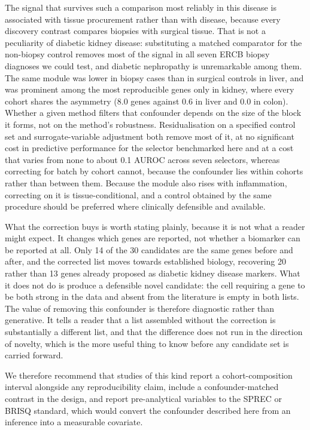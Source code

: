 \documentclass[pdflatex,sn-vancouver-num]{sn-jnl}
\theoremstyle{thmstyleone}
\theoremstyle{thmstyletwo}
\theoremstyle{thmstylethree}
\begin{document}
The signal that survives such a comparison most reliably in this disease is associated with
tissue procurement rather than with disease, because every discovery contrast compares biopsies with
surgical tissue. That is not a peculiarity of diabetic kidney disease: substituting a matched
comparator for the non-biopsy control removes most of the signal in all seven ERCB biopsy
diagnoses we could test, and diabetic nephropathy is unremarkable among them. The same module was
lower in biopsy cases than in surgical controls in liver, and was prominent among the most
reproducible genes only in kidney, where every cohort shares the asymmetry (8.0 genes against
0.6 in liver and 0.0 in colon). Whether a given method filters that confounder depends on the size of the block
it forms, not on the method's robustness. Residualisation on a specified control set and
surrogate-variable adjustment both remove most of it, at no significant cost in predictive
performance for the selector benchmarked here and at a cost that varies from none to about 0.1 AUROC across seven selectors, whereas correcting for batch by cohort cannot, because the confounder lies within
cohorts rather than between them. Because the module also rises with inflammation, correcting on
it is tissue-conditional, and a control obtained by the same procedure should be preferred
where clinically defensible and available.

What the correction buys is worth stating plainly, because it is not what a reader might expect.
It changes which genes are reported, not whether a biomarker can be reported at all. Only 14 of
the 30 candidates are the same genes before and after, and the corrected list moves towards
established biology, recovering 20 rather than 13 genes already proposed as diabetic kidney
disease markers. What it does not do is produce a defensible novel candidate: the cell requiring
a gene to be both strong in the data and absent from the literature is empty in both lists. The
value of removing this confounder is therefore diagnostic rather than generative. It tells a
reader that a list assembled without the correction is substantially a different list, and that
the difference does not run in the direction of novelty, which is the more useful thing to know
before any candidate set is carried forward.

We therefore recommend that studies of this kind report a cohort-composition interval alongside
any reproducibility claim, include a confounder-matched contrast in the design, and report
pre-analytical variables to the SPREC or BRISQ standard, which would convert the confounder
described here from an inference into a measurable covariate.
\end{document}

